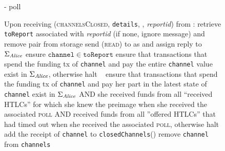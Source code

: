 \begin{figure}[H]
\begin{systembox}{\fpaynet - poll}
\begin{algorithmic}[1]
        \State {}
        \State Upon receiving (\textsc{channelsClosed}, \texttt{details},
        \alice, \textit{reportid}) from \simulator:
        \Indent
          \State retrieve \texttt{toReport} associated with \textit{reportid}
          (if none, ignore message) and remove pair from storage
          \State send (\textsc{read}) to \ledger{} as \alice{} and assign reply
          to $\Sigma_{\mathit{Alice}}$
            \State ensure $\mathtt{channel} \in \mathtt{toReport}$
              \State ensure that transactions that spend the funding tx of
              \texttt{channel} and pay \alice{} the entire \texttt{channel}
              value exist in $\Sigma_{\mathit{Alice}}$, otherwise halt
            \Else \ 
              \State ensure that transactions that spend the funding tx of
              \texttt{channel} and pay \alice{} her part in the latest state of
              \texttt{channel} exist in $\Sigma_{\mathit{Alice}}$ AND she received funds
              from all ``received HTLCs'' for which she knew the preimage when
              she received the associated \textsc{poll} AND received funds from
              all ''offered HTLCs'' that had timed out when she received the
              associated \textsc{poll}, otherwise halt
              \State {}
            \EndIf
            \State add the receipt of \texttt{channel} to
            \texttt{closedChannels}(\alice)
            \State remove \texttt{channel} from \texttt{channels}
          \EndFor
        \EndIndent
      \end{algorithmic}
    \end{systembox}
    \caption{}
    \label{alg:fpaynet:poll}
  \end{figure}

